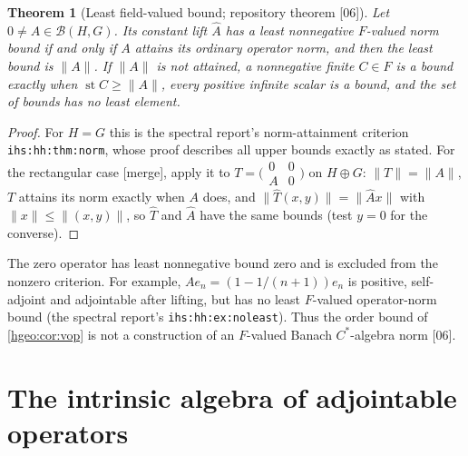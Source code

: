 \documentclass[11pt,letterpaper]{article}
\numberwithin{equation}{section}
\newtheorem{theorem}{Theorem}[section]
\theoremstyle{definition}
\theoremstyle{remark}
\newcommand{\F}{F}
\newcommand{\st}{\operatorname{st}}
\newcommand{\norm}[1]{\lVert #1\rVert}
\newcommand{\src}[1]{\textup{\textsf{\small[#1]}}}
\newcommand{\mergetag}{\textup{\textsf{\small[merge]}}}
\newcommand{\replabel}[1]{\nolinkurl{#1}}
\begin{document}
\begin{theorem}[Least field-valued bound; repository theorem \src{06}]
\label{hgeo:thm:norm}
Let $0\ne A\in\mathcal B(H,G)$. Its constant lift $\widehat A$ has a least
nonnegative $\F$-valued norm bound if and only if $A$ attains its ordinary
operator norm, and then the least bound is $\norm A$. If $\norm A$ is not
attained, a nonnegative finite $C\in\F$ is a bound exactly when
$\st C\ge\norm A$, every positive infinite scalar is a bound, and the set of
bounds has no least element.
\end{theorem}
\begin{proof}
For $H=G$ this is the spectral report's norm-attainment criterion
\replabel{ihs:hh:thm:norm}, whose proof describes all upper bounds exactly as
stated. For the rectangular case \mergetag, apply it to
$T=\bigl(\begin{smallmatrix}0&0\\A&0\end{smallmatrix}\bigr)$ on $H\oplus G$:
$\norm T=\norm A$, $T$ attains its norm exactly when $A$ does, and
$\norm{\widehat T(x,y)}=\norm{\widehat Ax}$ with
$\norm{x}\le\norm{(x,y)}$, so $\widehat T$ and $\widehat A$ have the same
bounds (test $y=0$ for the converse).
\end{proof}

The zero operator has least nonnegative bound zero and is excluded from the
nonzero criterion. For example, $Ae_n=(1-1/(n+1))e_n$ is positive,
self-adjoint and adjointable after lifting, but has no least $\F$-valued
operator-norm bound (the spectral report's \replabel{ihs:hh:ex:noleast}).
Thus the order bound of \cref{hgeo:cor:vop} is not a construction of an
$\F$-valued Banach $C^*$-algebra norm \src{06}.

\section{The intrinsic algebra of adjointable operators}
\label{hgeo:sec:adjoints}
\end{document}
